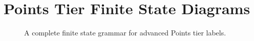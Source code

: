 \documentclass[11pt, twoside]{memoir}
\begin{document}
\section*{Points Tier Finite State Diagrams}
%
%
%

\begin{figure}[H]
\centering
%

%
\caption{A complete finite state grammar for advanced Points tier labels.%
}
\end{figure}







%
%
%
%
%
%
%
%
%
%
%



\end{document}
